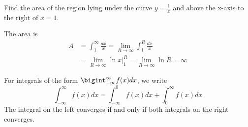 \documentclass[../calc1-main.tex]{subfiles}
\begin{document}
\begin{example}
	Find the area of the region lying under the curve $y=\frac{1}{x}$ and above the x-axis to the right of $x=1$.
\end{example}
\begin{minipage}{0.5\textwidth}
  \begin{solution}
  	The area is
  	\[
  	\begin{split}
  		A & = \int_1^{\infty} \frac{dx}{x} =
  		\lim_{R \to \infty} \int_1^R \frac{dx}{x} \\
  		& = \lim_{R \to \infty} \left. \ln x \right \vert_1^R=
  		\lim_{R \to \infty} \ln R =
  		\infty
  	\end{split}
  	\]
  \end{solution}
\end{minipage}%
\begin{minipage}{0.5\textwidth}
\begin{figure}[H]
  	\centering
\end{figure}
\end{minipage}

For integrals of the form $\bigint_{-\infty}^{\infty} f(x) dx$, we write
\[
	\int_{-\infty}^{\infty} f(x) dx = \int_{-\infty}^0 f(x) dx + \int_0^{\infty} f(x) dx
\]
The integral on the left converges if and only if both integrals on the right converges.
\end{document}
